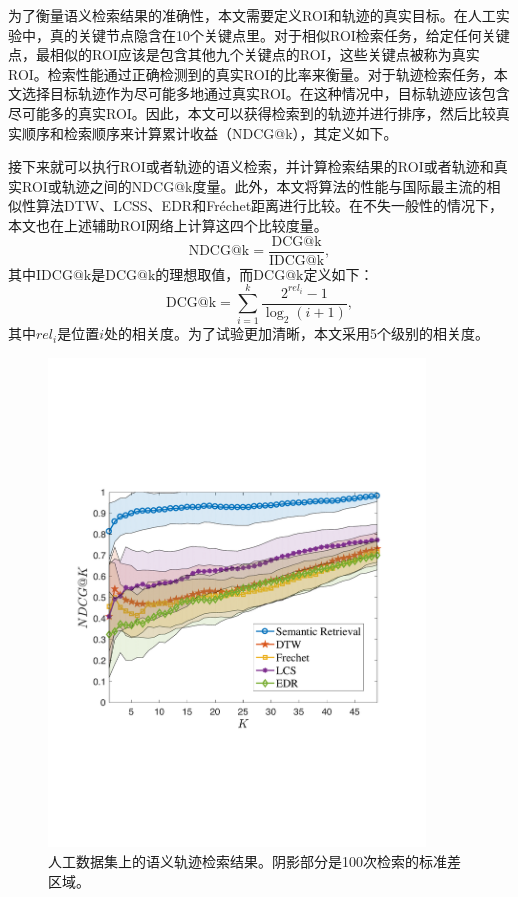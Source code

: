为了衡量语义检索结果的准确性，本文需要定义ROI和轨迹的真实目标。在人工实验中，真的关键节点隐含在10个关键点里。对于相似ROI检索任务，给定任何关键点，最相似的ROI应该是包含其他九个关键点的ROI，这些关键点被称为真实ROI。检索性能通过正确检测到的真实ROI的比率来衡量。对于轨迹检索任务，本文选择目标轨迹作为尽可能多地通过真实ROI。在这种情况中，目标轨迹应该包含尽可能多的真实ROI。因此，本文可以获得检索到的轨迹并进行排序，然后比较真实顺序和检索顺序来计算累计收益（NDCG@k），其定义如下。

接下来就可以执行ROI或者轨迹的语义检索，并计算检索结果的ROI或者轨迹和真实ROI或轨迹之间的NDCG@k度量。此外，本文将算法的性能与国际最主流的相似性算法DTW、LCSS、EDR和Fr\'echet距离进行比较。在不失一般性的情况下，本文也在上述辅助ROI网络上计算这四个比较度量。
\begin{equation}
\mathrm{NDCG@k} = \frac{\mathrm{DCG@k}}{\mathrm{IDCG@k}},
\label{eq:NDCG}
\end{equation}
其中$\mathrm{IDCG@k}$是$\mathrm{DCG@k}$的理想取值，而$\mathrm{DCG@k}$定义如下：
\begin{equation}
\mathrm{DCG@{k}} = \sum_{i=1}^{k} \frac{ 2^{rel_{i}} - 1 }{ \log_{2}(i+1)},
\label{eq:DCG}
\end{equation}
其中$rel_i$是位置$i$处的相关度。为了试验更加清晰，本文采用5个级别的相关度。

\tabcolsep=0.5pt
\begin{figure}[!b]
\centering
\includegraphics[width=100mm]{pics/synNDCG.pdf}
\caption{人工数据集上的语义轨迹检索结果。阴影部分是100次检索的标准差区域。}
\label{fig:synNDCG}
\end{figure}


